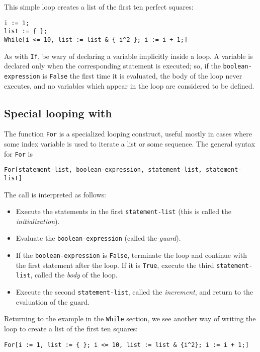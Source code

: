 This simple loop creates a list of the first ten perfect squares: 

\begin{verbatim}
i := 1;
list := { };
While[i <= 10, list := list & { i^2 }; i := i + 1;]
\end{verbatim}

As with \verb+If+, be wary of declaring a variable implicitly inside a
loop.  A variable is declared only when the corresponding statement is
executed; so, if the \verb+boolean-expression+ is \verb+False+ the
first time it is evaluated, the body of the loop never executes, and
no variables which appear in the loop are considered to be defined.

\subsection{Special looping with }

The function \verb+For+ is a specialized looping construct, useful
mostly in cases where some index variable is used to iterate a list or
some sequence.  The general syntax for \verb+For+ is

\begin{verbatim}
For[statement-list, boolean-expression, statement-list, statement-list]
\end{verbatim}

\noindent The call is interpreted as follows:
\begin{itemize}
\item Execute the statements in the first \verb+statement-list+ (this
is called the {\em initialization}).
\item Evaluate the \verb+boolean-expression+ (called the {\em guard}).
\item If the \verb+boolean-expression+ is \verb+False+, terminate the
loop and continue with the first statement after the loop.  If it is
\verb+True+, execute the third \verb+statement-list+, called the {\em
body} of the loop.
\item Execute the second \verb+statement-list+, called the {\em
increment}, and return to the evaluation of the guard.
\end{itemize}

Returning to the example in the \verb+While+ section, we see another
way of writing the loop to create a list of the first ten squares:

\begin{verbatim}
For[i := 1, list := { }; i <= 10, list := list & {i^2}; i := i + 1;]
\end{verbatim}

